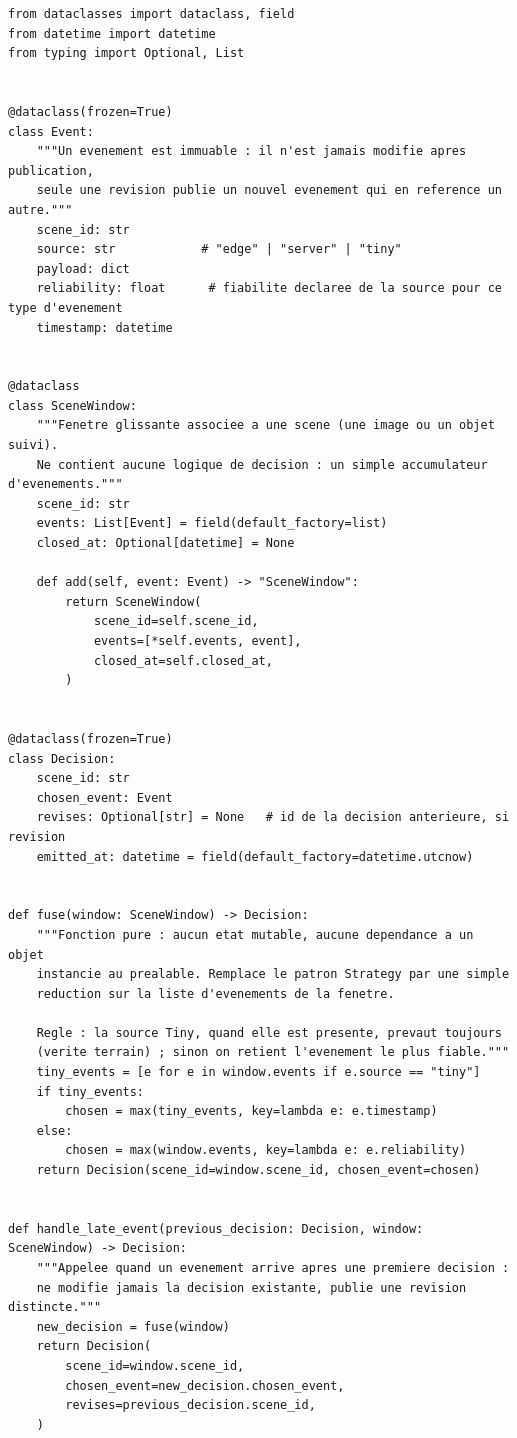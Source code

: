 \documentclass[11pt,a4paper]{article}
\begin{document}
\begin{lstlisting}[style=python, caption={Fusion comme réduction fonctionnelle sur une fenêtre d'événements}]
from dataclasses import dataclass, field
from datetime import datetime
from typing import Optional, List


@dataclass(frozen=True)
class Event:
    """Un evenement est immuable : il n'est jamais modifie apres publication,
    seule une revision publie un nouvel evenement qui en reference un autre."""
    scene_id: str
    source: str            # "edge" | "server" | "tiny"
    payload: dict
    reliability: float      # fiabilite declaree de la source pour ce type d'evenement
    timestamp: datetime


@dataclass
class SceneWindow:
    """Fenetre glissante associee a une scene (une image ou un objet suivi).
    Ne contient aucune logique de decision : un simple accumulateur d'evenements."""
    scene_id: str
    events: List[Event] = field(default_factory=list)
    closed_at: Optional[datetime] = None

    def add(self, event: Event) -> "SceneWindow":
        return SceneWindow(
            scene_id=self.scene_id,
            events=[*self.events, event],
            closed_at=self.closed_at,
        )


@dataclass(frozen=True)
class Decision:
    scene_id: str
    chosen_event: Event
    revises: Optional[str] = None   # id de la decision anterieure, si revision
    emitted_at: datetime = field(default_factory=datetime.utcnow)


def fuse(window: SceneWindow) -> Decision:
    """Fonction pure : aucun etat mutable, aucune dependance a un objet
    instancie au prealable. Remplace le patron Strategy par une simple
    reduction sur la liste d'evenements de la fenetre.

    Regle : la source Tiny, quand elle est presente, prevaut toujours
    (verite terrain) ; sinon on retient l'evenement le plus fiable."""
    tiny_events = [e for e in window.events if e.source == "tiny"]
    if tiny_events:
        chosen = max(tiny_events, key=lambda e: e.timestamp)
    else:
        chosen = max(window.events, key=lambda e: e.reliability)
    return Decision(scene_id=window.scene_id, chosen_event=chosen)


def handle_late_event(previous_decision: Decision, window: SceneWindow) -> Decision:
    """Appelee quand un evenement arrive apres une premiere decision :
    ne modifie jamais la decision existante, publie une revision distincte."""
    new_decision = fuse(window)
    return Decision(
        scene_id=window.scene_id,
        chosen_event=new_decision.chosen_event,
        revises=previous_decision.scene_id,
    )



\end{lstlisting}
\end{document}
